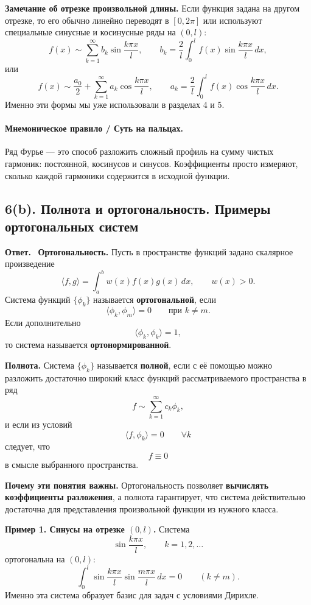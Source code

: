 \documentclass[a4paper,12pt]{article}
\newcommand{\Answer}{\textbf{Ответ.}\ }
\begin{document}
\textbf{Замечание об отрезке произвольной длины.}
Если функция задана на другом отрезке, то его обычно линейно переводят в $[0,2\pi]$ или используют специальные синусные и косинусные ряды на $(0,l)$:
\[
f(x)\sim \sum_{k=1}^{\infty}b_k\sin\frac{k\pi x}{l},
\qquad
b_k=\frac{2}{l}\int_0^l f(x)\sin\frac{k\pi x}{l}\,dx,
\]
или
\[
f(x)\sim \frac{a_0}{2}+\sum_{k=1}^{\infty}a_k\cos\frac{k\pi x}{l},
\qquad
a_k=\frac{2}{l}\int_0^l f(x)\cos\frac{k\pi x}{l}\,dx.
\]
Именно эти формы мы уже использовали в разделах 4 и 5.

\paragraph{Мнемоническое правило / Суть на пальцах.}
Ряд Фурье --- это способ разложить сложный профиль на сумму чистых гармоник: постоянной, косинусов и синусов. Коэффициенты просто измеряют, сколько каждой гармоники содержится в исходной функции.

\subsection*{6(b). Полнота и ортогональность. Примеры ортогональных систем}

\Answer
\textbf{Ортогональность.}
Пусть в пространстве функций задано скалярное произведение
\[
\langle f,g\rangle=\int_a^b w(x)f(x)g(x)\,dx,
\qquad w(x)>0.
\]
Система функций $\{\phi_k\}$ называется \textbf{ортогональной}, если
\[
\langle \phi_k,\phi_m\rangle=0
\qquad \text{при } k\ne m.
\]
Если дополнительно
\[
\langle \phi_k,\phi_k\rangle=1,
\]
то система называется \textbf{ортонормированной}.

\textbf{Полнота.}
Система $\{\phi_k\}$ называется \textbf{полной}, если с её помощью можно разложить достаточно широкий класс функций рассматриваемого пространства в ряд
\[
f\sim \sum_{k=1}^{\infty}c_k\phi_k,
\]
и если из условий
\[
\langle f,\phi_k\rangle=0
\qquad \forall k
\]
следует, что
\[
f\equiv 0
\]
в смысле выбранного пространства.

\textbf{Почему эти понятия важны.}
Ортогональность позволяет \textbf{вычислять коэффициенты разложения}, а полнота гарантирует, что система действительно достаточна для представления произвольной функции из нужного класса.

\textbf{Пример 1. Синусы на отрезке \texorpdfstring{$(0,l)$}{(0,l)}.}
Система
\[
\sin\frac{k\pi x}{l},
\qquad
k=1,2,\dots
\]
ортогональна на $(0,l)$:
\[
\int_0^l
\sin\frac{k\pi x}{l}\sin\frac{m\pi x}{l}\,dx=0
\qquad
(k\ne m).
\]
Именно эта система образует базис для задач с условиями Дирихле.
\end{document}
